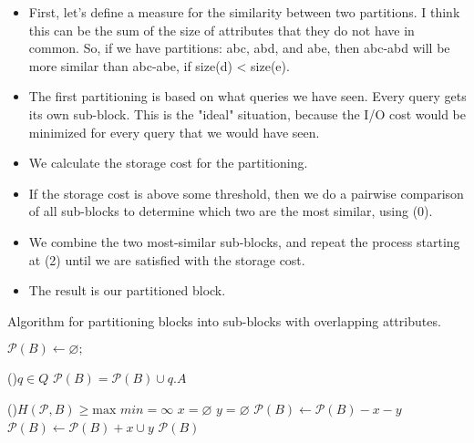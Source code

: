 \documentclass[twocolumn]{svjour3}          %
\let\emptyset\varnothing
\begin{document}
\begin{itemize}

\item First, let's define a measure for the similarity between two
partitions. I think this can be the sum of the size of attributes that
they do not have in common. So, if we have partitions: abc, abd, and
abe, then abc-abd will be more similar than abc-abe, if size(d) <
size(e).

\item The first partitioning is based on what queries we have seen.
Every query gets its own sub-block. This is the "ideal" situation,
because the I/O cost would be minimized for every query that we would
have seen.

\item We calculate the storage cost for the partitioning.

\item If the storage cost is above some threshold, then we do a pairwise
comparison of all sub-blocks to determine which two are the most
similar, using (0).

\item We combine the two most-similar sub-blocks, and repeat the process
starting at (2) until we are satisfied with the storage cost.

\item The result is our partitioned block.

\end{itemize}


\begin{algorithm}[h]
\scriptsize
\caption{Algorithm for partitioning blocks into sub-blocks with overlapping attributes.}
\label{alg:overlappingP}
$\mathcal{P}(B) \leftarrow \emptyset;$  

\For(){$q \in Q$}{ 
 $\mathcal{P}(B) = \mathcal{P}(B) \cup q.A$ 
}

\While(){$H(\mathcal{P}, B) \geq \text{max}$}{
    $min = \infty$ \; 
    $x = \emptyset$ \;
    $y = \emptyset$ \;
$ \mathcal{P}(B)  \leftarrow \mathcal{P}(B) - x - y$ \;
 $\mathcal{P}(B)  \leftarrow \mathcal{P}(B)  + x \cup y$ \;
}
\Return $ \mathcal{P}(B)$  
\end{algorithm} 





 
\end{document}
